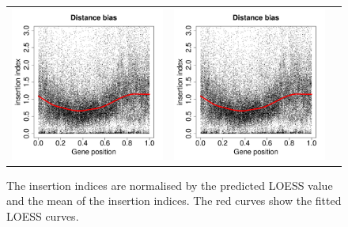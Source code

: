 \documentclass[a4paper,10pt, twocolumn]{article}
\begin{document}
\begin{figure}
\begin{tabular}{c c c}
\includegraphics[page=23, scale=0.22]{biases-without-ends.pdf} &
\includegraphics[page=25, scale=0.22]{biases-without-ends.pdf}
\end{tabular}
\caption{The insertion indices are normalised by the predicted LOESS value and the mean of the insertion indices. The red curves show the fitted LOESS curves.}
\label{fig:normalised_distance_bias}
\end{figure}
\end{document}
